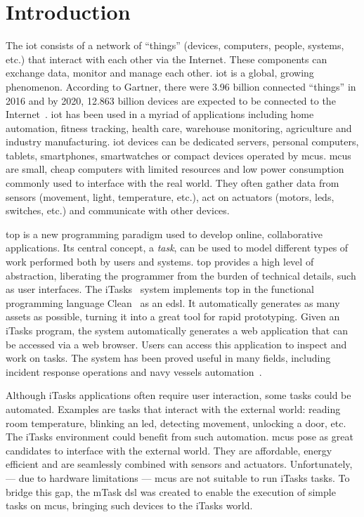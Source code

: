 \section{Introduction}
The \ac{iot} consists of a network of ``things'' (devices, computers, people, systems, etc.) that interact with each other via the Internet. These components can exchange data, monitor and manage each other. \ac{iot} is a global, growing phenomenon. According to Gartner, there were 3.96 billion connected ``things'' in 2016 and by 2020, 12.863 billion devices are expected to be connected to the Internet~\cite{iot_numbers}. \ac{iot} has been used in a myriad of applications including home automation, fitness tracking, health care, warehouse monitoring, agriculture and industry manufacturing. \ac{iot} devices can be dedicated servers, personal computers, tablets, smartphones, smartwatches or compact devices operated by \glspl{mcu}. \Glspl{mcu} are small, cheap computers with limited resources and low power consumption commonly used to interface with the real world. They often gather data from sensors (movement, light, temperature, etc.), act on actuators (motors, \acsp{led}, switches, etc.) and communicate with other devices.

\ac{top} is a new programming paradigm used to develop online, collaborative applications. Its central concept, a \textit{task}, can be used to model different types of work performed both by users and systems. \ac{top} provides a high level of abstraction, liberating the programmer from the burden of technical details, such as user interfaces. The iTasks~\cite{top} system implements \ac{top} in the functional programming language Clean~\cite{clean} as an \ac{edsl}. It automatically generates as many assets as possible, turning it into a great tool for rapid prototyping. Given an iTasks program, the system automatically generates a web application that can be accessed via a web browser. Users can access this application to inspect and work on tasks. The system has been proved useful in many fields, including incident response operations and navy vessels automation~\cite{incidone,navy}.

Although iTasks applications often require user interaction, some tasks could be automated. Examples are tasks that interact with the external world: reading room temperature, blinking an \acs{led}, detecting movement, unlocking a door,  etc. The iTasks environment could benefit from such automation. \Glspl{mcu} pose as great candidates to interface with the external world. They are affordable, energy efficient and are seamlessly combined with sensors and actuators. Unfortunately, --- due to hardware limitations --- \glspl{mcu} are not suitable to run iTasks tasks. To bridge this gap, the \gls{mTask} \ac{dsl} was created to enable the execution of simple tasks on \glspl{mcu}, bringing such devices to the \gls{iTasks} world.


